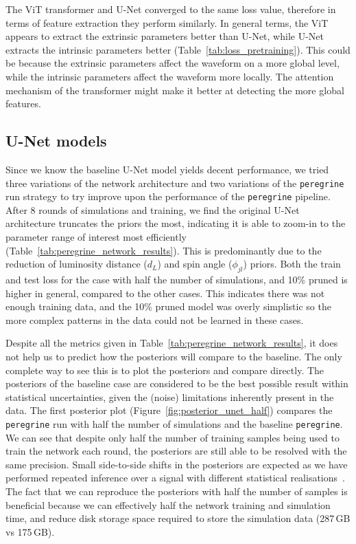 
The ViT transformer and U-Net converged to the same loss value, therefore in terms of feature extraction they perform similarly. In general terms, the ViT appears to extract the extrinsic parameters better than U-Net, while U-Net extracts the intrinsic parameters better (Table~\ref{tab:loss_pretraining}). This could be because the extrinsic parameters affect the waveform on a more global level, while the intrinsic parameters affect the waveform more locally. The attention mechanism of the transformer might make it better at detecting the more global features.

\subsection{U-Net models}

Since we know the baseline U-Net model yields decent performance, we tried three variations of the network architecture and two variations of the \texttt{peregrine} run strategy to try improve upon the performance of the \texttt{peregrine} pipeline. After 8 rounds of simulations and training, we find the original U-Net architecture truncates the priors the most, indicating it is able to zoom-in to the parameter range of interest most efficiently (Table~\ref{tab:peregrine_network_results}). This is predominantly due to the reduction of luminosity distance ($d_L$) and spin angle ($\phi_{jl}$) priors. Both the train and test loss for the case with half the number of simulations, and 10\% pruned is higher in general, compared to the other cases. This indicates there was not enough training data, and the 10\% pruned model was overly simplistic so the more complex patterns in the data could not be learned in these cases.


Despite all the metrics given in Table~\ref{tab:peregrine_network_results}, it does not help us to predict how the posteriors will compare to the baseline. The only complete way to see this is to plot the posteriors and compare directly. The posteriors of the baseline case are considered to be the best possible result within statistical uncertainties, given the (noise) limitations inherently present in the data. The first posterior plot (Figure~\ref{fig:posterior_unet_half}) compares the \texttt{peregrine} run with half the number of simulations and the baseline \texttt{peregrine}. We can see that despite only half the number of training samples being used to train the network each round, the posteriors are still able to be resolved with the same precision. Small side-to-side shifts in the posteriors are expected as we have performed repeated inference over a signal with different statistical realisations~\cite{bhardwaj2023peregrine}. The fact that we can reproduce the posteriors with half the number of samples is beneficial because we can effectively half the network training and simulation time, and reduce disk storage space required to store the simulation data (287\,GB vs 175\,GB).

